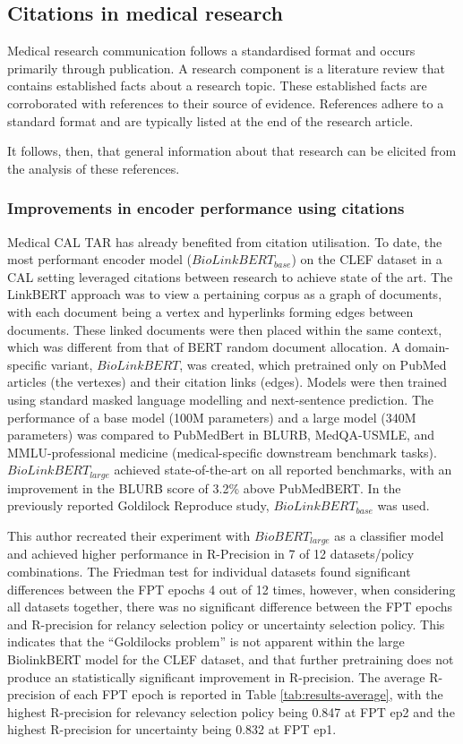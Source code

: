 \documentclass[../main.tex]{subfiles}
\begin{document}
\subsection{Citations in medical research}

Medical research communication follows a standardised format and occurs primarily through publication. A research component is a literature review that contains established facts about a research topic. These established facts are corroborated with references to their source of evidence. References adhere to a standard format and are typically listed at the end of the research article.

It follows, then, that general information about that research can be elicited from the analysis of these references.

\subsubsection{Improvements in encoder performance using citations}

Medical CAL TAR has already benefited from citation utilisation. To date, the most performant encoder model ($BioLinkBERT_{base}$) on the CLEF dataset in a CAL setting leveraged citations between research to achieve state of the art. The LinkBERT approach was to view a pertaining corpus as a graph of documents, with each document being a vertex and hyperlinks forming edges between documents. These linked documents were then placed within the same context, which was different from that of BERT random document allocation. A domain-specific variant, $BioLinkBERT$, was created, which pretrained only on  PubMed articles (the vertexes) and their citation links (edges). Models were then trained using standard masked language modelling and next-sentence prediction. The performance of a base model (100M parameters) and a large model (340M parameters) was compared to PubMedBert in BLURB, MedQA-USMLE, and MMLU-professional medicine (medical-specific downstream benchmark tasks). $BioLinkBERT_{large}$ achieved state-of-the-art on all reported benchmarks, with an improvement in the BLURB score of 3.2\% above PubMedBERT. In the previously reported Goldilock Reproduce study, $BioLinkBERT_{base}$ was used. 

This author recreated their experiment with $BioBERT_{large}$ as a classifier model and achieved higher performance in R-Precision in 7 of 12 datasets/policy combinations.  The Friedman test for individual datasets found significant differences between the FPT epochs 4 out of 12 times, however, when considering all datasets together, there was no significant difference between the FPT epochs and R-precision for relancy selection policy or uncertainty selection policy. This indicates that the ``Goldilocks problem'' is not apparent within the large BiolinkBERT model for the CLEF dataset, and that further pretraining does not produce an statistically significant improvement in R-precision. The average R-precision of each FPT epoch is reported in Table \ref{tab:results-average}, with the highest R-precision for relevancy selection policy being 0.847 at FPT ep2 and the highest R-precision for uncertainty being  0.832 at FPT ep1. 
\end{document}
